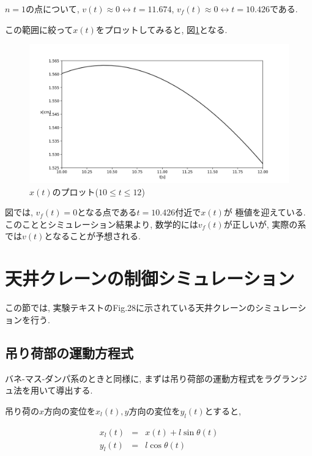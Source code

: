 \documentclass[titlepage]{jsarticle}
\begin{document}
            $n = 1$の点について,
            $v(t) \approx 0 \leftrightarrow t = 11.674$,
            $v_f(t) \approx 0 \leftrightarrow t = 10.426$である.

            この範囲に絞って$x(t)$をプロットしてみると,
            図\ref{fig:surp}となる.

            \begin{figure}[h]
                \centering
                \includegraphics[width=15cm]{img/surp.png}
                \caption{$x(t)$のプロット($10\leq t \leq 12$)}
                \label{fig:surp}
            \end{figure}

            図では, $v_f(t) = 0$となる点である$t=10.426$付近で$x(t)$が
            極値を迎えている.
            このこととシミュレーション結果より, 数学的には$v_f(t)$が正しいが,
            実際の系では$v(t)$となることが予想される.

\section{天井クレーンの制御シミュレーション}
    この節では, 実験テキスト\cite{text}のFig.28に示されている天井クレーンのシミュレーションを行う.
    \subsection{吊り荷部の運動方程式}
        バネ-マス-ダンパ系のときと同様に,
        まずは吊り荷部の運動方程式をラグランジュ法を用いて導出する.

        吊り荷の$x$方向の変位を$x_l(t), y方向の変位をy_l(t)$とすると,

        \begin{eqnarray*}
            x_l(t) &=& x(t) + l\sin{\theta(t)} \\
            y_l(t) &=& l\cos{\theta(t)}
        \end{eqnarray*}
\end{document}
